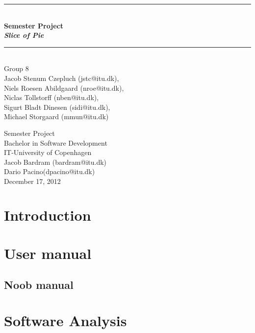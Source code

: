\documentclass[a4paper,11pt]{article}
\begin{document}
\begin{titlepage}
\centering \parindent=0pt
\newcommand{\HRule}{\rule{\textwidth}{1mm}}
 \HRule\\[1cm]\Huge\bfseries
Semester Project\\\emph{Slice of Pie}\\[0.7cm]
\HRule\\[4cm]  \large Group 8
\\Jacob Stenum Czepluch (jstc@itu.dk), \\Niels Roesen Abildgaard (nroe@itu.dk), \\Niclas Tollstorff (nben@itu.dk), \\Sigurt Bladt Dinesen (sidi@itu.dk), \\Michael Storgaard (mmun@itu.dk)\\
 \normalsize %
\begin{flushleft}
Semester Project\\
Bachelor in Software Development\\
IT-University of Copenhagen\\
Jacob Bardram (bardram@itu.dk)\\
Dario Pacino(dpacino@itu.dk) \\
December 17, 2012 \end{flushleft}
\end{titlepage}

\tableofcontents
\pagebreak

\pagebreak
\section{Introduction}


\pagebreak
\section{User manual}


\subsection{Noob manual}


\pagebreak
\section{Software Analysis}

\end{document}
